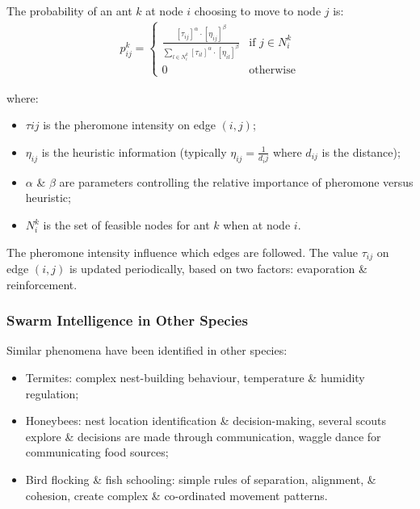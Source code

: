 \documentclass[a4paper,11pt]{article}
\begin{document}
The probability of an ant $k$ at node $i$ choosing to move to node $j$ is:
\begin{align*}
    p^{k}_{ij} =
    \begin{cases}
        \frac{[\tau_{ij}]^\alpha \cdot [\eta_{ij}]^\beta}{\sum_{l \in N_i^k} [\tau_{il}]^\alpha \cdot [\eta_{il}]^\beta} & \text{if } j \in N^k_i \\
        0 & \text{otherwise}
    \end{cases}
\end{align*}

where:
\begin{itemize}
    \item   $\tau{ij}$ is the pheromone intensity on edge $(i,j)$;
    \item   $\eta_{ij}$ is the heuristic information (typically $\eta_{ij} = \frac{1}{d_ij}$ where $d_{ij}$ is the distance);
    \item   $\alpha$ \& $\beta$ are parameters controlling the relative importance of pheromone versus heuristic;
    \item   $N_i^k$ is the set of feasible nodes for ant $k$ when at node $i$.
\end{itemize}

The pheromone intensity influence which edges are followed.
The value $\tau_{ij}$ on edge $(i,j)$ is updated periodically, based on two factors:
evaporation \& reinforcement.

\subsubsection{Swarm Intelligence in Other Species}
Similar phenomena have been identified in other species:
\begin{itemize}
    \item   Termites: complex nest-building behaviour, temperature \& humidity regulation;
    \item   Honeybees: nest location identification \& decision-making, several scouts explore \& decisions are made through communication, waggle dance for communicating food sources;
    \item   Bird flocking \& fish schooling: simple rules of separation, alignment, \& cohesion, create complex \& co-ordinated movement patterns.
\end{itemize}
\end{document}
